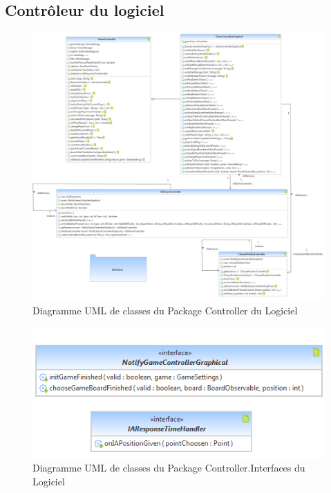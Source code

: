 \documentclass[a4paper,12pt]{report}
\begin{document}
\subsection{Contrôleur du logiciel}
\label{OthKerController}
\begin{figure}[H]
\centering
\includegraphics[scale=0.4]{Kernel/Pack_com_controller.png}
\caption{Diagramme UML de classes du Package Controller du Logiciel}
\end{figure}


\label{OthKerControllerInterfaces}
\begin{figure}[H]
\centering
 \includegraphics[scale=1.0]{Kernel/Pack_com_controller_interfaces.png}
\caption{Diagramme UML de classes du Package Controller.Interfaces du Logiciel}
\end{figure}
\end{document}
